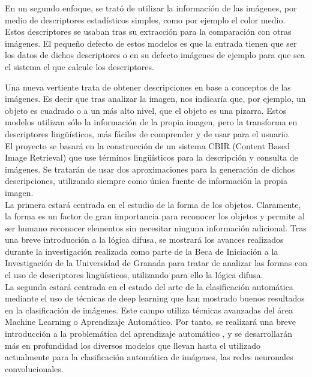 En un segundo enfoque, se trató de utilizar la información de las imágenes, por medio de descriptores estadísticos simples, como por ejemplo el color medio. Estos descriptores se usaban tras su extracción para la comparación con otras imágenes. El pequeño defecto de estos modelos es que la entrada tienen que ser los datos de dichos descriptores o en su defecto imágenes de ejemplo para que sea el sistema el que calcule los descriptores.

Una nueva vertiente trata de obtener descripciones en base a conceptos de las imágenes. Es decir que tras analizar la imagen, nos indicaría que, por ejemplo, un objeto es cuadrado o a un más alto nivel, que el objeto es una pizarra. Estos modelos utilizan sólo la información de la propia imagen, pero la transforma en descriptores lingüísticos, más fáciles de comprender y de usar para el usuario.\\

El proyecto se basará en la construcción de un sistema CBIR (Content Based Image Retrieval) que use términos lingüísticos para la descripción y consulta de imágenes. Se tratarán de usar dos aproximaciones para la generación de dichos descripciones, utilizando siempre como única fuente de información la propia imagen.\\

La primera estará centrada en el estudio de la forma de los objetos. Claramente, la forma es un factor de gran importancia para reconocer los objetos y permite al ser humano reconocer elementos sin necesitar ninguna información adicional. Tras una breve introducción a la lógica difusa\cite{Zadeh-Fuzzy-1965}\cite{Ross}, se mostrará los avances realizados durante la investigación realizada como parte de la Beca de Iniciación a la Investigación de la Universidad de Granada para tratar de analizar las formas con el uso de descriptores lingüísticos, utilizando para ello la lógica difusa.\\

La segunda estará centrada en el estado del arte de la clasificación automática mediante el uso de técnicas de deep learning que han mostrado buenos resultados en la clasificación de imágenes. Este campo utiliza técnicas avanzadas del área Machine Learning o Aprendizaje Automático. Por tanto, se realizará una breve introducción a la problemática del aprendizaje automático \cite{Abu-Mostafa:2012:LD:2207825}, y se desarrollarán más en profundidad los diversos modelos que llevan hasta el utilizado actualmente para la clasificación automática de imágenes, las redes neuronales convolucionales\cite{Bishop:2006:PRM:1162264}\cite{lecun-89e}.\\


